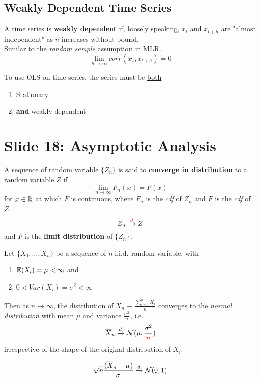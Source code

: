 \documentclass[]{article}
\begin{document}
		\subsection{Weakly Dependent Time Series}
			\begin{definition}
				A time series is \textbf{weakly dependent} if, loosely speaking, $x_{t}$ and $x_{t+h}$ are "almost independent" as $n$ increases without bound. \\
				Similar to the \emph{random sample} assumption in MLR. \\
				\[
					\lim_{h\to \infty} corr(x_t, x_{t+h}) = 0
				\]
			\end{definition}
		\begin{remark}
			To use OLS on time series, the series must be \ul{both}
			\begin{enumerate}
				\item Stationary
				\item \textbf{and} weakly dependent
			\end{enumerate}
		\end{remark}
	
	\section{Slide 18: Asymptotic Analysis}
		\begin{definition}
			A sequence of random variable $\{Z_n\}$ is said to \textbf{converge in distribution} to a random variable $Z$ if 
			\[
				\lim_{n \to \infty} F_n(x) = F(x)
			\]
			for $x \in \mathbb{R}$ at which $F$ is continuous, where $F_n$ is the \emph{cdf} of $Z_n$ and $F$ is the \emph{cdf} of $Z$.
			\[
				Z_n \xrightarrow{\textcolor{red}{d}} Z
			\]
			and $F$ is the \textbf{limit distribution} of $\{Z_n\}$.
		\end{definition}
		
		\begin{theorem}
			Let $\{X_1, \dots, X_n\}$ be a sequence of $n$ i.i.d. random variable, with 
			\begin{enumerate}
				\item $\mathbb{E}({X_i}) = \mu < \infty$ and
				\item $0 < Var(X_i) = \sigma^2 < \infty$
			\end{enumerate}
			Then as $n \to \infty$, the distribution of $\overline{X}_n \equiv \frac{\sum_{i=1}^n X_i}{n}$ converges to the \emph{normal distribution} with mean $\mu$ and variance $\frac{\sigma^2}{n}$, i.e.
			\[
				\overline{X}_n \xrightarrow{d} \mathcal{{N}}(\mu, \frac{\sigma^2}{\textcolor{red}{n}})
			\]
			irrespective of the shape of the original distribution of $X_i$.
		\end{theorem}
		\begin{corollary}
			\[
				\sqrt{n} \frac{(\overline{X}_n - \mu)}{\sigma} \xrightarrow{d} \mathcal{{N}}(0,1)
			\]
		\end{corollary}
		
\end{document}
